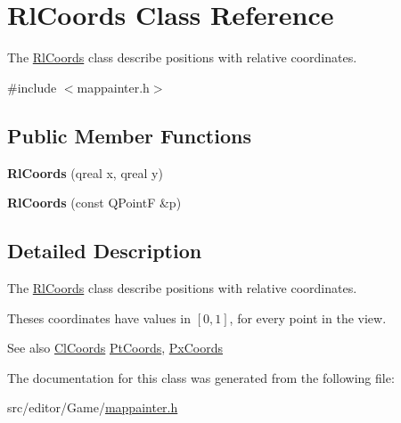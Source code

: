 \hypertarget{class_rl_coords}{\section{\-Rl\-Coords \-Class \-Reference}
\label{class_rl_coords}
}


\-The \hyperlink{class_rl_coords}{\-Rl\-Coords} class describe positions with relative coordinates.  




{\ttfamily \#include $<$mappainter.\-h$>$}

\subsection*{\-Public \-Member \-Functions}
\begin{DoxyCompactItemize}
\item 
\hypertarget{class_rl_coords_ada69216f57050aa6a7b88aa4cb051335}{{\bfseries \-Rl\-Coords} (qreal x, qreal y)}\label{class_rl_coords_ada69216f57050aa6a7b88aa4cb051335}

\item 
\hypertarget{class_rl_coords_a71620c03bf57e61ec3b35af29dab3382}{{\bfseries \-Rl\-Coords} (const \-Q\-Point\-F \&p)}\label{class_rl_coords_a71620c03bf57e61ec3b35af29dab3382}

\end{DoxyCompactItemize}


\subsection{\-Detailed \-Description}
\-The \hyperlink{class_rl_coords}{\-Rl\-Coords} class describe positions with relative coordinates. 

\-Theses coordinates have values in $[0,1]$, for every point in the view.

\begin{DoxySeeAlso}{\-See also}
\hyperlink{class_cl_coords}{\-Cl\-Coords} \hyperlink{class_pt_coords}{\-Pt\-Coords}, \hyperlink{class_px_coords}{\-Px\-Coords} 
\end{DoxySeeAlso}


\-The documentation for this class was generated from the following file\-:\begin{DoxyCompactItemize}
\item 
src/editor/\-Game/\hyperlink{mappainter_8h}{mappainter.\-h}\end{DoxyCompactItemize}
